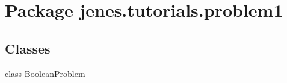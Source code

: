 \hypertarget{namespacejenes_1_1tutorials_1_1problem1}{\section{Package jenes.\-tutorials.\-problem1}
\label{namespacejenes_1_1tutorials_1_1problem1}
}
\subsection*{Classes}
\begin{DoxyCompactItemize}
\item 
class \hyperlink{classjenes_1_1tutorials_1_1problem1_1_1_boolean_problem}{Boolean\-Problem}
\end{DoxyCompactItemize}
